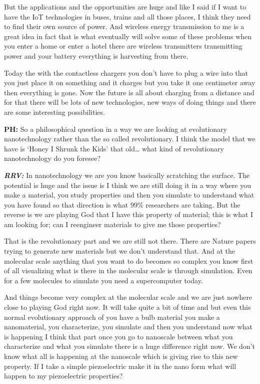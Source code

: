 But the applications and the opportunities are huge and like I said if I want to have the IoT technologies in buses, trains and all those places, I think they need to find their own source of power. And wireless energy transmission to me is a great idea in fact that is what eventually will solve some of these problems when you enter  a home or enter a hotel there are wireless transmitters transmitting power and your battery everything is harvesting from there. 

Today the with the contactless chargers you don’t have to plug a wire into that you just place it on something and it charges but you take it one centimeter away then everything is gone. Now the future is all about charging from a distance and for that there will be lots of new technologies, new ways of doing things and there are some interesting possibilities.

\textbf{PH:} So a philosophical question in a way we are looking at evolutionary nanotechnology rather than the so called revolutionary. I think the model that we have is ‘Honey I Shrunk the Kids’ that old… what kind of revolutionary nanotechnology do you foresee?

\textbf{\textit{RRV:}} In nanotechnology we are you know basically scratching the surface. The potential is huge and the issue is I think we are still doing it in a way where you make a material, you study properties and then you simulate to understand what you have found so that direction is what 99\% researchers are taking. But the reverse is we are playing God that I have this property of material; this is what I am looking for; can I reengineer materials to give me those properties? 

That is the revolutionary part and we are still not there. There are Nature papers trying to generate new materials but we don’t understand that. And at the molecular scale anything that you want to do becomes so complex you know first of all visualizing what is there in the molecular scale is through simulation. Even for a few molecules to simulate you need a supercomputer today. 

And things become very complex at the molecular scale and we are just nowhere close to playing God right now. It will take quite a bit of time and but even this normal evolutionary approach of you have a bulb material you make a nanomaterial, you characterize, you simulate and then you understand now what is happening I think that part once you go to nanoscale between what you characterize and what you simulate there is a huge difference right now. We don’t know what all is happening at the nanoscale which is giving rise to this new property. If I take a simple piezoelectric make it in the nano form what will happen to my piezoelectric properties? 

